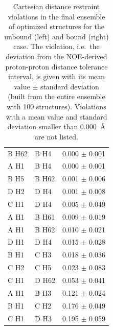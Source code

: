\begin{table}
\begin{tabular}{llc}
B H62 & B H4 & 0.000 $\pm$ 0.001 \\
A H1 & B H4 & 0.000 $\pm$ 0.001 \\
B H5 & B H62 & 0.001 $\pm$ 0.006 \\
D H2 & D H4 & 0.001 $\pm$ 0.008 \\
C H1 & D H4 & 0.005 $\pm$ 0.049 \\
A H1 & B H61 & 0.009 $\pm$ 0.019 \\
A H1 & B H62 & 0.010 $\pm$ 0.021 \\
D H1 & D H4 & 0.015 $\pm$ 0.028 \\
B H1 & C H3 & 0.018 $\pm$ 0.036 \\
C H2 & C H5 & 0.023 $\pm$ 0.083 \\
C H1 & D H62 & 0.053 $\pm$ 0.041 \\
A H1 & B H3 & 0.121 $\pm$ 0.024 \\
B H1 & C H2 & 0.176 $\pm$ 0.049 \\
C H1 & D H3 & 0.195 $\pm$ 0.059 \\
\midrule
\end{tabular}
\caption{
Cartesian distance restraint violations in the final ensemble of optimized
structures for the unbound (left) and bound (right) case. The violation, i.e.\
the deviation from the NOE-derived proton-proton distance tolerance interval, is
given with its mean value $\pm$ standard deviation (built from the entire
ensemble with 100 structures). Violations with a mean value and standard
deviation smaller than \SI{0.000}{\angstrom} are not listed.}
\label{tab:nmr:restraint_viols_free}
\end{table}


